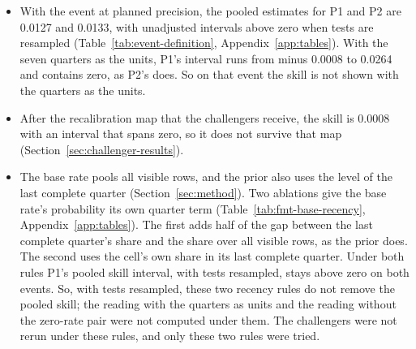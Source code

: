 \begin{itemize}
\item With the event at planned precision, the pooled estimates for P1 and P2 are 0.0127 and 0.0133, with unadjusted intervals above zero when tests are resampled (Table~\ref{tab:event-definition}, Appendix~\ref{app:tables}). With the seven quarters as the units, P1's interval runs from minus 0.0008 to 0.0264 and contains zero, as P2's does. So on that event the skill is not shown with the quarters as the units.
\item After the recalibration map that the challengers receive, the skill is 0.0008 with an interval that spans zero, so it does not survive that map (Section~\ref{sec:challenger-results}).
\item The base rate pools all visible rows, and the prior also uses the level of the last complete quarter (Section~\ref{sec:method}). Two ablations give the base rate's probability its own quarter term (Table~\ref{tab:fmt-base-recency}, Appendix~\ref{app:tables}). The first adds half of the gap between the last complete quarter's share and the share over all visible rows, as the prior does. The second uses the cell's own share in its last complete quarter. Under both rules P1's pooled skill interval, with tests resampled, stays above zero on both events. So, with tests resampled, these two recency rules do not remove the pooled skill; the reading with the quarters as units and the reading without the zero-rate pair were not computed under them. The challengers were not rerun under these rules, and only these two rules were tried.

\end{itemize}
